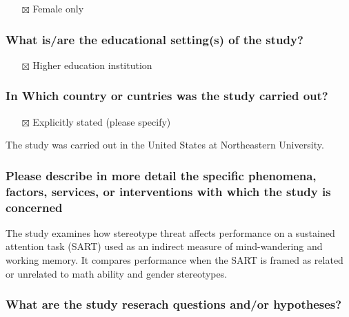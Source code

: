 \documentclass[
  doc, a4paper]{apa7}
\providecommand{\tightlist}{%
  \setlength{\itemsep}{0pt}\setlength{\parskip}{0pt}}
\begin{document}
\begin{itemize}
\tightlist
\item[$\boxtimes$]
  Female only
\end{itemize}

\subsubsection{What is/are the educational setting(s) of the study?}\label{what-isare-the-educational-settings-of-the-study}

\begin{itemize}
\tightlist
\item[$\boxtimes$]
  Higher education institution
\end{itemize}

\subsubsection{In Which country or cuntries was the study carried out?}\label{in-which-country-or-cuntries-was-the-study-carried-out}

\begin{itemize}
\tightlist
\item[$\boxtimes$]
  Explicitly stated (please specify)
\end{itemize}

The study was carried out in the United States at Northeastern University.

\subsubsection{Please describe in more detail the specific phenomena, factors, services, or interventions with which the study is concerned}\label{please-describe-in-more-detail-the-specific-phenomena-factors-services-or-interventions-with-which-the-study-is-concerned}

The study examines how stereotype threat affects performance on a sustained attention task (SART) used as an indirect measure of mind-wandering and working memory. It compares performance when the SART is framed as related or unrelated to math ability and gender stereotypes.

\subsubsection{What are the study reserach questions and/or hypotheses?}\label{what-are-the-study-reserach-questions-andor-hypotheses}
\end{document}
